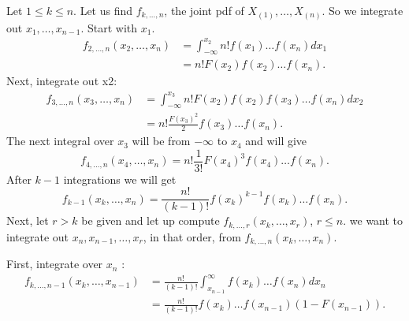 Let $1 \le k \le  n$. Let us find $f_{k ,\ldots, n}$, the joint pdf of $X_{(1)} , \ldots , X_{(n)}$. So we integrate out $x_{1} , \ldots , x_{n-1}$. Start with $x_1$. 
\begin{align*}
	f_{2 ,\ldots,n }\left( x_{2} , \ldots , x_{n} \right) &= \int_{-\infty}^{x_2} n! f\left( x_1 \right) \ldots f\left( x_{n} \right) dx_1  \\
							      &= n! F\left( x_2 \right) f\left( x_2  \right) \ldots f\left( x_{n} \right) 
.\end{align*}
Next, integrate out x2: 
\begin{align*}
	f_{3, \ldots, n}\left( x_{3} , \ldots , x_{n} \right) &= \int_{-\infty}^{x_{3}} n! F\left( x_2 \right) f\left( x_2 \right) f\left( x_3 \right) \ldots f\left( x_{n} \right) dx_{2}  \\
							      &= n! \frac{F\left( x_3 \right) ^2}{2}f\left( x_3 \right) \ldots f\left( x_{n} \right)
.\end{align*}
The next integral over $x_3$ will be from $-\infty$ to $x_4$ and will give 
\[
	f_{4, \ldots, n}\left( x_{4} , \ldots , x_{n} \right) = n!\frac{1}{3!} F\left( x_4 \right) ^3 f\left( x_4 \right) \ldots f\left( x_{n} \right) 
.\] 
After $k - 1$ integrations we will get 
 \[
	 f_{k - 1}\left( x_{k} , \ldots , x_{n} \right) = \frac{n!}{\left( k - 1 \right) !}f\left( x_{k} \right) ^{k - 1} f\left( x_{k} \right) \ldots f \left( x_{n} \right) 
.\] 
Next, let $r>k$ be given and let up compute $f_{k , \ldots, r}\left( x_{k} , \ldots , x_{r} \right) $, $r\le n$. we want to integrate out $x_{n}, x_{n-1} , \ldots , x_{r}$, in that order, from $f_{k , \ldots, n}\left( x_{k} , \ldots , x_{n} \right)$. 

First, integrate over $x_{n}$ : 
\begin{align*}
	f_{k , \ldots, n -1}\left( x_{k} , \ldots , x_{n-1} \right) &= \frac{n!}{\left( k - 1 \right) !}\int_{x_{n-1}}^{\infty} f\left( x_{k} \right) \ldots f\left( x_{n} \right) dx_{n}  \\
								    &= \frac{n!}{\left( k - 1 \right) !} f\left( x_{k} \right) \ldots f\left( x_{n-1} \right) \left( 1 - F\left( x_{n - 1} \right)  \right) 
.\end{align*}

